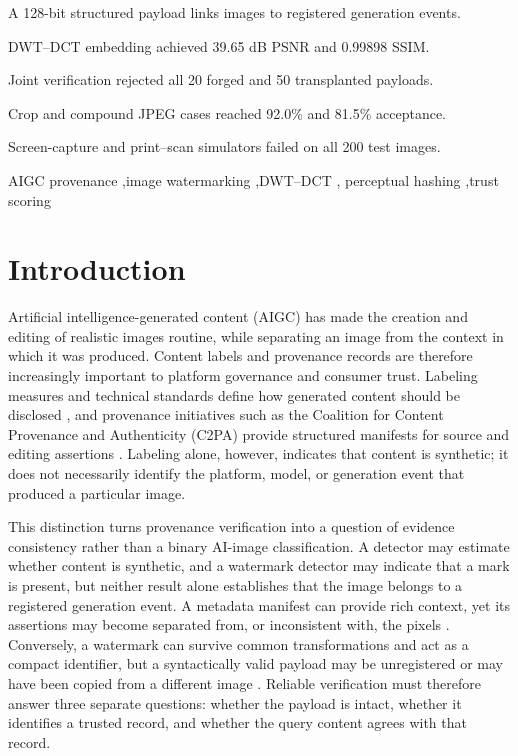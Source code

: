 \documentclass[a4paper,fleqn]{cas-sc}
\begin{document}
\begin{highlights}
\item A 128-bit structured payload links images to registered generation events.
\item DWT--DCT embedding achieved 39.65 dB PSNR and 0.99898 SSIM.
\item Joint verification rejected all 20 forged and 50 transplanted payloads.
\item Crop and compound JPEG cases reached 92.0\% and 81.5\% acceptance.
\item Screen-capture and print--scan simulators failed on all 200 test images.
\end{highlights}

\begin{keywords}
AIGC provenance \sep image watermarking \sep DWT--DCT \sep
perceptual hashing \sep trust scoring
\end{keywords}

\maketitle

\section{Introduction}\label{sec:intro}
Artificial intelligence-generated content (AIGC) has made the creation and
editing of realistic images routine, while separating an image from the
context in which it was produced. Content labels and provenance records are
therefore increasingly important to platform governance and consumer trust.
Labeling measures and technical standards define how generated content should
be disclosed \cite{ai_content_labeling_measures_2025,gb45438_2025}, and
provenance initiatives such as the Coalition for Content Provenance and
Authenticity (C2PA) provide structured manifests for source and editing
assertions \cite{noauthor_content_nodate,collomosse_authenticity_2024}.
Labeling alone, however, indicates that content is synthetic; it does not
necessarily identify the platform, model, or generation event that produced a
particular image.

This distinction turns provenance verification into a question of evidence
consistency rather than a binary AI-image classification. A detector may
estimate whether content is synthetic, and a watermark detector may indicate
that a mark is present, but neither result alone establishes that the image
belongs to a registered generation event. A metadata manifest can provide rich
context, yet its assertions may become separated from, or inconsistent with,
the pixels \cite{nemecek_authenticated_2026}. Conversely, a watermark can
survive common transformations and act as a compact identifier, but a
syntactically valid payload may be unregistered or may have been copied from a
different image \cite{saberi_drew_2024,jiang_watermark-based_2026}. Reliable
verification must therefore answer three separate questions: whether the
payload is intact, whether it identifies a trusted record, and whether the
query content agrees with that record.
\end{document}

